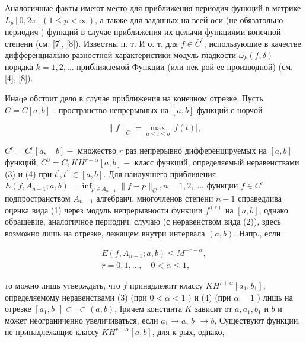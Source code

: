 \documentclass[10pt]{article}
\begin{document}
Аналогичные факты имеют место для приближения периодич функций в метрике $L_{p}[0,2 \pi](1 \leqslant p<\infty)$, а также для заданных на всей оси (не обязатөльно периодич ) функций в случае приближения их целычи функциями конечной степени (см. [7], [8]). Известны п. т. И о. т. для $f \in \bar{C}^{r}$, использующие в качестве дифференциально-разностной характеристики модуль гладкости $\omega_{k}(f, \delta)$ порядка $k=1,2, \ldots$ приближаемой Функции (или нек-рой ее производной) (см. [4], [8]).



Инаqе обстоит дело в случае приближения на конечном отрөзке. Пусть $C=C[a, b]$ - пространство непрерывных на $[a, b]$ функций с норчой



\[

\|f\|_{C}=\max _{a \leqslant t \leqslant b}|f(t)|,

\]



$C^{r}=C^{r}[a, \quad b]-$ множество $r$ раз непрерывно дифференцируемых на $[a, b]$ функций, $C^{0}=C, K H^{r+\alpha}[a, b]-$ класс функций, определяемый неравенствами (3) и (4) при $t^{\prime}, t^{\prime \prime} \in[a, b]$. Для наилучшего приблияения $E\left(f, A_{n-1} ; a, b\right)=\inf _{p \in A_{n-1}}\|f-p\|_{C}, n=1,2, \ldots$, функции $f \in C^{r}$ подпространством $A_{n-1}$ алгебраич. многочленов степени $n-1$ справедлива оценка вида (1) через модуль непрерывности функции $f^{(r)}$ на $[a, b]$, однако обращевие, аналогичное периодич. случаю (с нөравенством вида (2)), здесь возможно лишь на отрезке, лежащем внутри интервала $(a, b)$. Напр., если



\[

\begin{gathered}

E\left(f, A_{n-1} ; a, b\right) \leqslant M^{-r-\alpha}, \\

r=0,1, \ldots, \quad 0<\alpha \leqslant 1,

\end{gathered}

\]



то можно лишь утверждать, что $f$ принадлежит классу $K H^{r+\alpha}\left[a_{1}, b_{1}\right]$, определяемому неравенствами (3) (при $0<\alpha<1$ ) и (4) (при $\alpha=1$ ) лишь на отрезке $\left[a_{1}, b_{1}\right] \subset$ $\subset(a, b)$, Іричем константа $K$ зависит от $a, a_{1}, b_{1}$ и $b$ и может неограниченно увеличиваться, если $a_{1} \rightarrow a$, $b_{1} \rightarrow b$, Существуют функции, не принадлежащие классу $K H^{r+\alpha}[a, b]$, для к-рых, однако,
\end{document}
